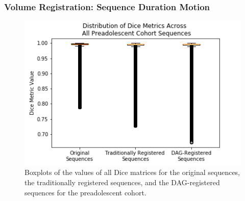 
%

\subsubsection{Volume Registration: Sequence Duration Motion}

\begin{figure}[]
\centering
\includegraphics[height=0.3\textheight]{6/figures/preads-dice-box.png}
\caption{Boxplots of the values of all Dice matrices for the original sequences, the traditionally registered sequences, and the DAG-registered sequences for the preadolescent cohort.}
\label{fig:preads-dice-box}
\end{figure}

